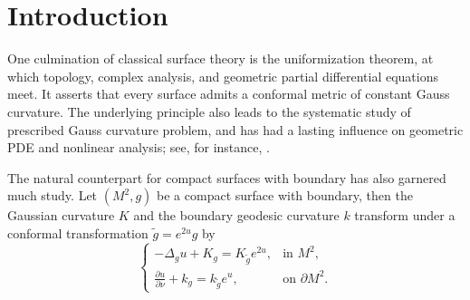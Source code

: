 \documentclass[11pt,a4paper,twoside]{amsart}
\newtheorem{sketch proof}{Sketch of the proof}[section]
\begin{document}
\begin{abstract}
    In this paper, we study the Liouville equation with a nonlinear Neumann boundary condition
\begin{equation*}
    \begin{cases}
-\Delta u = Ke^{2u} & \text{in } \mathbb{B}^{2},\\[2mm]
\dfrac{\partial u}{\partial \nu}+\lambda = ke^{u} & \text{on } \partial\mathbb{B}^{2},
\end{cases}
\end{equation*}
where $K,k\in\mathbb{R}$, $\lambda\in(0,1]$ are constants,  and $\nu$ denotes the outward unit normal on $ \partial\mathbb{B}^{2}$.
We establish a classification of all smooth solutions to the equation.
Our approach is a boundary-adapted P-function method which treats all signs of $K$ and $k$ within a unified framework.
As applications of the classification result, we establish a family of sharp Sobolev-trace-type inequalities encompassing the classical Lebedev--Milin inequality, together with a corresponding deficit estimate.
\end{abstract}

\maketitle
\section{Introduction}

One culmination of classical surface theory is the uniformization theorem, at which topology, complex analysis, and geometric partial differential equations meet.
It asserts that every surface admits a conformal metric of constant Gauss curvature. The underlying principle also leads to the systematic study of prescribed Gauss curvature problem, and has had a lasting influence on geometric PDE and nonlinear analysis; see, for instance, \cite{KW71,KW74,Mos73,CY87, CGY93}.

The natural counterpart for compact surfaces with boundary has also garnered much study. Let $(M^2,g)$ be a compact surface with boundary, then the Gaussian curvature $K$ and the boundary geodesic curvature $k$ transform under a conformal transformation $\tilde{g}=e^{2u}g$ by
\begin{equation}
\label{eq. general conformal curvature equation}
    \begin{cases}
        -\Delta_g u+K_g=K_{\tilde{g}}e^{2u}, 
        &\text{in }M^2,\\[2mm]
        \displaystyle{\frac{\partial u}{\partial\nu}
        +k_g=k_{\tilde{g}}e^u}, 
        &\text{on }\partial M^2.
    \end{cases}
\end{equation}
\end{document}
